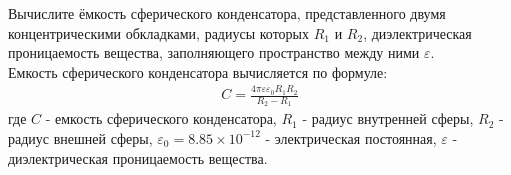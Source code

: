 \documentclass[__main__.tex]{subfiles}
\begin{document}
Вычислите ёмкость сферического конденсатора, представленного двумя концентрическими обкладками, радиусы которых $R_1$ и $R_2$, диэлектрическая проницаемость вещества, заполняющего пространство между ними $\varepsilon$.\\

Емкость сферического конденсатора вычисляется по формуле:
\begin{gather*}
    C = \frac{4\pi\varepsilon\varepsilon_0 R_1 R_2}{R_2-R_1}
\end{gather*}
где $C$ - емкость сферического конденсатора, $R_1$ - радиус внутренней сферы, $R_2$ - радиус внешней сферы, $\varepsilon_0 = 8.85\times 10^{-12}$ - электрическая постоянная, $\varepsilon$ - диэлектрическая проницаемость вещества.
\end{document}
